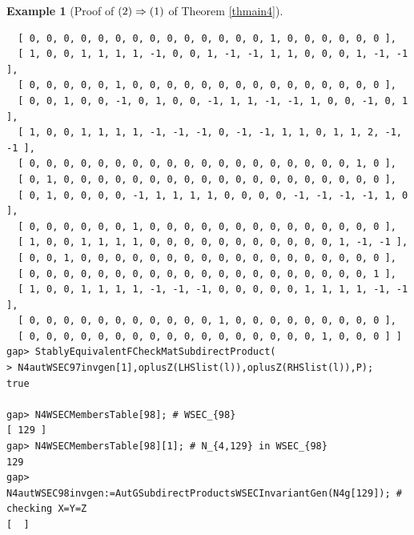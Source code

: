 \documentclass{amsart}
\theoremstyle{plain}
\theoremstyle{definition}
\newtheorem{example}[theorem]{Example}
\theoremstyle{remark}
\begin{document}
\begin{example}[Proof of ${\rm (2)}\Rightarrow {\rm (1)}$ of {Theorem \ref{thmain4}}]
\begin{verbatim}
  [ 0, 0, 0, 0, 0, 0, 0, 0, 0, 0, 0, 0, 0, 0, 1, 0, 0, 0, 0, 0, 0 ], 
  [ 1, 0, 0, 1, 1, 1, 1, -1, 0, 0, 1, -1, -1, 1, 1, 0, 0, 0, 1, -1, -1 ], 
  [ 0, 0, 0, 0, 0, 1, 0, 0, 0, 0, 0, 0, 0, 0, 0, 0, 0, 0, 0, 0, 0 ], 
  [ 0, 0, 1, 0, 0, -1, 0, 1, 0, 0, -1, 1, 1, -1, -1, 1, 0, 0, -1, 0, 1 ], 
  [ 1, 0, 0, 1, 1, 1, 1, -1, -1, -1, 0, -1, -1, 1, 1, 0, 1, 1, 2, -1, -1 ], 
  [ 0, 0, 0, 0, 0, 0, 0, 0, 0, 0, 0, 0, 0, 0, 0, 0, 0, 0, 0, 1, 0 ], 
  [ 0, 1, 0, 0, 0, 0, 0, 0, 0, 0, 0, 0, 0, 0, 0, 0, 0, 0, 0, 0, 0 ], 
  [ 0, 1, 0, 0, 0, 0, -1, 1, 1, 1, 1, 0, 0, 0, 0, -1, -1, -1, -1, 1, 0 ], 
  [ 0, 0, 0, 0, 0, 0, 1, 0, 0, 0, 0, 0, 0, 0, 0, 0, 0, 0, 0, 0, 0 ], 
  [ 1, 0, 0, 1, 1, 1, 1, 0, 0, 0, 0, 0, 0, 0, 0, 0, 0, 0, 1, -1, -1 ], 
  [ 0, 0, 1, 0, 0, 0, 0, 0, 0, 0, 0, 0, 0, 0, 0, 0, 0, 0, 0, 0, 0 ], 
  [ 0, 0, 0, 0, 0, 0, 0, 0, 0, 0, 0, 0, 0, 0, 0, 0, 0, 0, 0, 0, 1 ], 
  [ 1, 0, 0, 1, 1, 1, 1, -1, -1, -1, 0, 0, 0, 0, 0, 1, 1, 1, 1, -1, -1 ], 
  [ 0, 0, 0, 0, 0, 0, 0, 0, 0, 0, 0, 1, 0, 0, 0, 0, 0, 0, 0, 0, 0 ], 
  [ 0, 0, 0, 0, 0, 0, 0, 0, 0, 0, 0, 0, 0, 0, 0, 0, 0, 1, 0, 0, 0 ] ]
gap> StablyEquivalentFCheckMatSubdirectProduct(
> N4autWSEC97invgen[1],oplusZ(LHSlist(l)),oplusZ(RHSlist(l)),P);
true

gap> N4WSECMembersTable[98]; # WSEC_{98}
[ 129 ]
gap> N4WSECMembersTable[98][1]; # N_{4,129} in WSEC_{98}
129
gap> N4autWSEC98invgen:=AutGSubdirectProductsWSECInvariantGen(N4g[129]); # checking X=Y=Z
[  ]


\end{verbatim}
\end{example}
\end{document}
